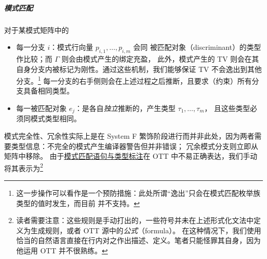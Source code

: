 \documentclass[a4paper, 11pt]{article}
\theoremstyle{remark}\newtheorem*{remark}{Remark}
\theoremstyle{definition}\newtheorem*{definition}{Definition}
\begin{document}
\subparagraph*{模式匹配} 对于某模式矩阵中的
\begin{itemize}\itemsep0em
  \item 每一分支 \(i\)：模式行向量 \(p_{i,1}, \ldots, p_{i,m}\) 会同
    被匹配对象（discriminant）的类型作比较；而 $\Gamma$ 则会由模式产生的绑定充盈，
    此外，模式产生的 TV 则会在其自身分支内被标记为刚性。通过这些机制，我们能够保证 TV 不会逸出到其他分支。\footnote{
      这一步操作可以看作是一个预防措施：此处所谓“逸出”只会在模式匹配枚举族类型的值时发生，而目前 \Tigris 并不支持。
    }
    每一分支的右手侧则会在上述过程之后推断，且要求（约束）所有分支具备相同类型。
  \item 每一被匹配对象 \(e_j\)：是各自\emph{独立}推断的，产生类型 \(\tau_1, \ldots, \tau_m\)，
    且这些类型必须同模式类型相同。
\end{itemize}
模式完全性、冗余性实际上是在 System F 繁饰阶段进行而并非此处，因为两者需要类型信息：不完全的模式产生编译器警告但并非错误；
冗余模式分支则立即从矩阵中移除。
由于\underline{模式匹配语句与类型标注}在 OTT 中不易正确表达，我们手动将其表示为\footnote{
  读者需要注意：这些规则是手动打出的，一些符号并未在上述形式化文法中定义为生成规则，或者 OTT 源中的\emph{公式}（formula）。
  在这种情况下，我们使用恰当的自然语言直接在行内对之作出描述、定义。笔者只能怪罪其自身，因为他运用 OTT 并不很熟练。
}
\end{document}
